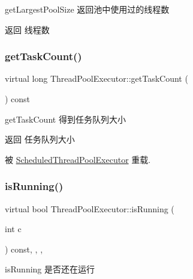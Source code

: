 get\+Largest\+Pool\+Size 返回池中使用过的线程数 

\begin{DoxyReturn}{返回}
线程数 
\end{DoxyReturn}
\mbox{\label{classThreadPoolExecutor_a61e8321202e6b0f6ea014485e8e10450}} 
\subsubsection{\texorpdfstring{get\+Task\+Count()}{getTaskCount()}}
{\footnotesize\ttfamily virtual long Thread\+Pool\+Executor\+::get\+Task\+Count (\begin{DoxyParamCaption}{ }\end{DoxyParamCaption}) const\hspace{0.3cm}{\ttfamily [virtual]}}



get\+Task\+Count 得到任务队列大小 

\begin{DoxyReturn}{返回}
任务队列大小 
\end{DoxyReturn}


被 \hyperlink{classScheduledThreadPoolExecutor_a786bc8478d265dfe0288de9397c7f768}{Scheduled\+Thread\+Pool\+Executor} 重载.

\mbox{\label{classThreadPoolExecutor_a841ae2189d6f85b9df9f69dec5375341}} 
\subsubsection{\texorpdfstring{is\+Running()}{isRunning()}}
{\footnotesize\ttfamily virtual bool Thread\+Pool\+Executor\+::is\+Running (\begin{DoxyParamCaption}\item[{int}]{c }\end{DoxyParamCaption}) const\hspace{0.3cm}{\ttfamily [inline]}, {\ttfamily [final]}, {\ttfamily [protected]}, {\ttfamily [virtual]}}



is\+Running 是否还在运行 



